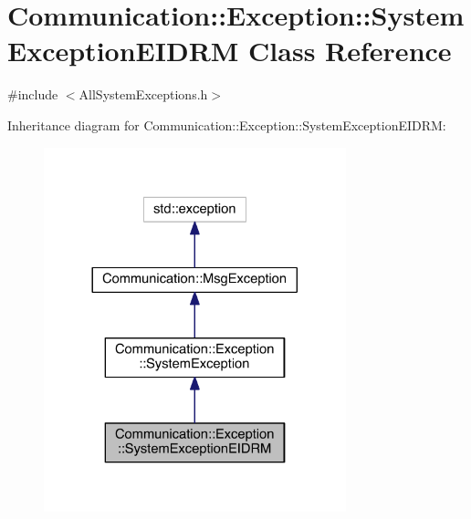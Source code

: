\hypertarget{class_communication_1_1_exception_1_1_system_exception_e_i_d_r_m}{}\section{Communication\+:\+:Exception\+:\+:System\+Exception\+E\+I\+D\+R\+M Class Reference}
\label{class_communication_1_1_exception_1_1_system_exception_e_i_d_r_m}


{\ttfamily \#include $<$All\+System\+Exceptions.\+h$>$}



Inheritance diagram for Communication\+:\+:Exception\+:\+:System\+Exception\+E\+I\+D\+R\+M\+:\nopagebreak
\begin{figure}[H]
\begin{center}
\leavevmode
\includegraphics[width=248pt]{class_communication_1_1_exception_1_1_system_exception_e_i_d_r_m__inherit__graph}
\end{center}
\end{figure}


